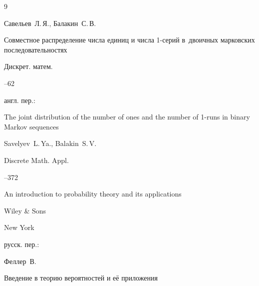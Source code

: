 \begin{thebibliography}{9}





\by Савельев~Л.\,Я., Балакин~С.\,В.

\paper Совместное распределение числа единиц и числа 1-серий в~двоичных марковских последовательностях

\jour Дискрет. матем.




--62





\transl англ. пер.:~

\paper The joint distribution of the number of ones and the number of 1-runs in binary Markov sequences

\by Savelyev~L.\,Ya.,  Balakin~S.\,V.

\jour Discrete Math. Appl.




--372





\book An introduction to probability theory and its applications


\publ Wiley \& Sons

\publaddr New York



\rtransl русск. пер.:~

\by Феллер~В.

\book Введение в теорию вероятностей и её приложения


\end{thebibliography}
